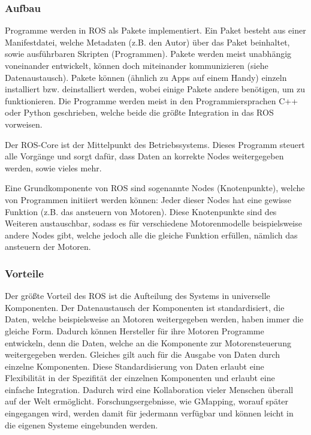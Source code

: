 {{{		}
		
		\subsubsection{Aufbau}
		{ 
			Programme werden in ROS als Pakete implementiert. Ein Paket besteht aus einer Manifestdatei, welche Metadaten (z.B. den Autor) über das Paket beinhaltet, sowie ausführbaren Skripten (Programmen). Pakete werden meist unabhängig voneinander entwickelt, können doch miteinander kommunizieren (siehe Datenaustausch). Pakete können (ähnlich zu Apps auf einem Handy) einzeln installiert bzw. deinstalliert werden, wobei einige Pakete andere benötigen, um zu funktionieren. Die Programme werden meist in den Programmiersprachen C++ oder Python geschrieben, welche beide die größte Integration in das ROS vorweisen.
			
			Der ROS-Core ist der Mittelpunkt des Betriebssystems. Dieses Programm steuert alle Vorgänge und sorgt dafür, dass Daten an korrekte Nodes weitergegeben werden, sowie vieles mehr. 
			
			Eine Grundkomponente von ROS sind sogenannte Nodes (Knotenpunkte), welche von Programmen initiiert werden können: Jeder dieser Nodes hat eine gewisse Funktion (z.B. das ansteuern von Motoren). Diese Knotenpunkte sind des Weiteren austauschbar, sodass es für verschiedene Motorenmodelle beispielsweise andere Nodes gibt, welche jedoch alle die gleiche Funktion erfüllen, nämlich das ansteuern der Motoren. \parencite{rosgenerationrobotics}
		}
	
		\subsubsection{Vorteile}
		{
			Der größte Vorteil des ROS ist die Aufteilung des Systems in universelle Komponenten. Der Datenaustausch der Komponenten ist standardisiert, \dahe die Daten, welche beispielsweise an Motoren weitergegeben werden, haben immer die gleiche Form. Dadurch können Hersteller für ihre Motoren Programme entwickeln, denn die Daten, welche an die Komponente zur Motorensteuerung weitergegeben werden. Gleiches gilt auch für die Ausgabe von Daten durch einzelne Komponenten. Diese Standardisierung von Daten erlaubt eine Flexibilität in der Spezifität der einzelnen Komponenten und erlaubt eine einfache Integration. Dadurch wird eine Kollaboration vieler Menschen überall auf der Welt ermöglicht. Forschungsergebnisse, wie \zb GMapping, worauf später eingegangen wird, werden damit für jedermann verfügbar und können leicht in die eigenen Systeme eingebunden werden.\parencite{Quigley09}
		}
		
}}
